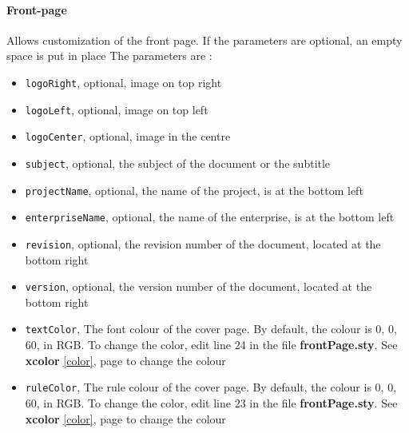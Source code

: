 \paragraph{Front-page}
Allows customization of the front page. If the parameters are optional, an empty space is put in
place
The parameters are :
\begin{itemize}
    \item \texttt{logoRight}, optional, image on top right
    \item \texttt{logoLeft}, optional, image on top left
    \item \texttt{logoCenter}, optional, image in the centre
    \item \texttt{subject}, optional, the subject of the document or the subtitle
    \item \texttt{projectName}, optional, the name of the project, is at the bottom left
    \item \texttt{enterpriseName}, optional, the name of the enterprise, is at the bottom
          left
    \item \texttt{revision}, optional, the revision number of the document, located at
          the bottom right
    \item \texttt{version}, optional, the version number of the document, located at the
          bottom right
    \item \texttt{textColor}, The font colour of the cover page. By default, the colour is
          0, 0, 60, in RGB. To change the color, edit line 24 in the file \textbf{frontPage.sty}.
          See \textbf{xcolor} \ref{color}, page \pageref{color} to change the colour
    \item \texttt{ruleColor}, The rule colour of the cover page. By default, the colour is
          0, 0, 60, in RGB. To change the color, edit line 23 in the file \textbf{frontPage.sty}.
          See \textbf{xcolor} \ref{color}, page \pageref{color} to change the colour
\end{itemize}

